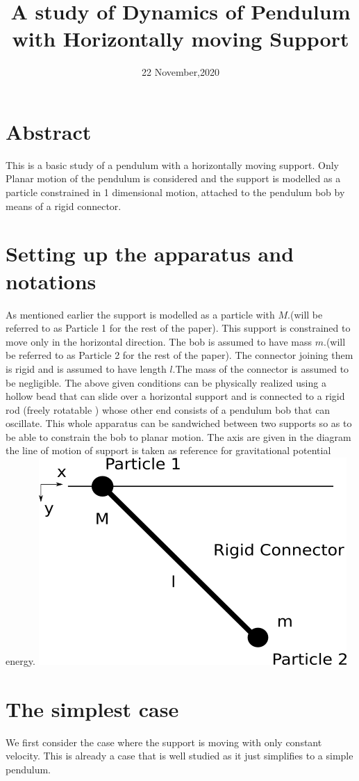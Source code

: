 \documentclass{article}
\title{A study of Dynamics of Pendulum with Horizontally moving Support}
\date{22 November,2020}
\begin{document}
	\maketitle

	\section*{Abstract}
	This is a basic study of a pendulum with a horizontally moving support. Only Planar motion of the pendulum is considered and the support is modelled as a particle constrained in 1 dimensional motion, attached to the pendulum bob by means of a rigid connector.
	
	\section*{Setting up the apparatus and notations}
	As mentioned earlier the support is modelled as a particle with $ M $.(will be referred to as Particle 1 for the rest of the paper). This support is constrained to move only in the horizontal direction. The bob is assumed to have mass $ m $.(will be referred to as Particle 2 for the rest of the paper). The connector joining them is rigid and is assumed to have length $ l $.The mass of the connector is assumed to be negligible. The above given conditions can be physically realized using a hollow bead that can slide over a horizontal support and is connected to a rigid rod (freely rotatable ) whose other end consists of a pendulum bob that can oscillate. This whole apparatus can be sandwiched between two supports so as to be able to constrain the bob to planar motion.
	The axis are given in the diagram the line of motion of support is taken as reference for gravitational potential energy.
	\includegraphics[width=0.5\linewidth]{PendulumDiagram.png}
			
	\section{The simplest case}
	We first consider the case where the support is moving with only constant velocity. This is already a case that is well studied as it just simplifies to a simple pendulum.
	
\end{document}
